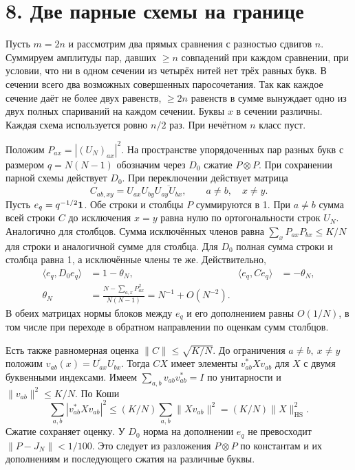 \documentclass[11pt,a4paper]{article}
\newcommand{\sect}[1]{\section*{\sffamily\color{ink}#1}}
\begin{document}
\newpage
\sect{8. Две парные схемы на границе}
Пусть \(m=2n\) и рассмотрим два прямых сравнения с разностью сдвигов \(n\). Суммируем амплитуды пар, давших \(\ge n\) совпадений при каждом сравнении, при условии, что ни в одном сечении из четырёх нитей нет трёх равных букв. В сечении всего два возможных совершенных паросочетания. Так как каждое сечение даёт не более двух равенств, \(\ge2n\) равенств в сумме вынуждает одно из двух полных спариваний на каждом сечении. Буквы \(x\) в сечении различны. Каждая схема используется ровно \(n/2\) раз. При нечётном \(n\) класс пуст.

Положим \(P_{ax}=|(U_N)_{ax}|^2\). На пространстве упорядоченных пар разных букв с размером \(q=N(N-1)\) обозначим через \(D_0\) сжатие \(P\otimes P\). При сохранении парной схемы действует \(D_0\). При переключении действует матрица
\[
   C_{ab,xy}=U_{ax}U_{by}\overline{U_{ay}U_{bx}},
                       \qquad a\ne b,\quad x\ne y.
\]
Пусть \(e_q=q^{-1/2}{\bf1}\). Обе строки и столбцы \(P\) суммируются в 1. При \(a\ne b\) сумма всей строки \(C\) до исключения \(x=y\) равна нулю по ортогональности строк \(U_N\). Аналогично для столбцов. Сумма исключённых членов равна \(\sum_x P_{ax}P_{bx}\le K/N\) для строки и аналогичной сумме для столбца. Для \(D_0\) полная сумма строки и столбца равна 1, а исключённые члены те же. Действительно,
\[
\begin{aligned}
 \langle e_q,D_0e_q\rangle&=1-\theta_N, &
 \langle e_q,Ce_q\rangle&=-\theta_N,\\[-1pt]
 \theta_N&=\frac{N-\sum_{a,x}P_{ax}^2}{N(N-1)}
                      =N^{-1}+O(N^{-2}).
\end{aligned}                                                       \tag{7}
\]
В обеих матрицах нормы блоков между \(e_q\) и его дополнением равны \(O(1/N)\), в том числе при переходе в обратном направлении по оценкам сумм столбцов.

Есть также равномерная оценка \(\|C\|\le\sqrt{K/N}\). До ограничения \(a\ne b,\ x\ne y\) положим \(v_{ab}(x)=\overline{U_{ax}}U_{bx}\). Тогда \(C X\) имеет элементы \(v_{ab}^*Xv_{ab}\) для \(X\) с двумя буквенными индексами. Имеем \(\sum_{a,b}v_{ab}v_{ab}^*=I\) по унитарности и \(\|v_{ab}\|^2\le K/N\). По Коши
\[
 \sum_{a,b}|v_{ab}^*Xv_{ab}|^2\le
        (K/N)\sum_{a,b}\|Xv_{ab}\|^2=(K/N)\|X\|_{\mathrm{HS}}^2 .
\]
Сжатие сохраняет оценку. У \(D_0\) норма на дополнении \(e_q\) не превосходит \(\|P-J_N\|<1/100\). Это следует из разложения \(P\otimes P\) по константам и их дополнениям и последующего сжатия на различные буквы.
\end{document}

